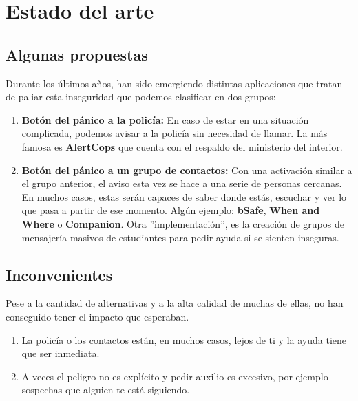 \chapter{Estado del arte}\label{ch:art}
\section{Algunas propuestas}
Durante los últimos años, han sido emergiendo distintas aplicaciones que tratan de paliar esta inseguridad que podemos clasificar en dos grupos:
\begin{enumerate}
\item \textbf{Botón del pánico a la policía:} En caso de estar en una situación complicada, podemos avisar a la policía sin necesidad de llamar. La más famosa es \textbf{AlertCops} que cuenta con el respaldo del ministerio del interior.
\item \textbf{Botón del pánico a un grupo de contactos:} Con una activación similar a el grupo anterior, el aviso esta vez se hace a una serie de personas cercanas. En muchos casos, estas serán capaces de saber donde estás, escuchar y ver lo que pasa a partir de ese momento. Algún ejemplo: \textbf{bSafe}, \textbf{When and Where} o \textbf{Companion}.
Otra ''implementación'', es la creación de grupos de mensajería masivos de estudiantes para pedir ayuda si se sienten inseguras.
\end{enumerate}

\section{Inconvenientes}
Pese a la cantidad de alternativas y a la alta calidad de muchas de ellas, no han conseguido tener el impacto que esperaban.
\begin{enumerate}
  \item La policía o los contactos están, en muchos casos, lejos de ti y la ayuda tiene que ser inmediata.
  \item A veces el peligro no es explícito y pedir auxilio es excesivo, por ejemplo sospechas que alguien te está siguiendo.
\end{enumerate}

